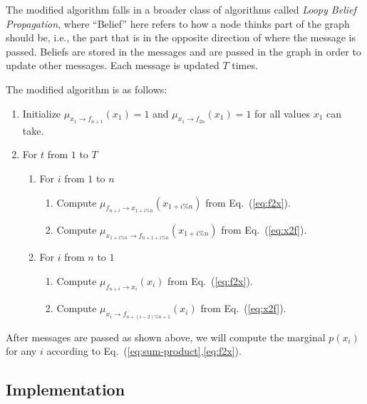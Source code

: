 \documentclass[11pt]{article}
\begin{document}
The modified algorithm falls in a broader class of algorithms called \textit{Loopy Belief Propagation}, where ``Belief'' here refers to how a node thinks part of the graph should be, i.e., the part that is in the opposite direction of where the message
is passed. Beliefs are stored in the messages and are passed in the graph in order to update other messages. Each message is updated $T$ times.

The modified algorithm is as follows:
\begin{enumerate}
\item Initialize $\mu_{x_1\rightarrow f_{n+1}}(x_1)=1$ and $\mu_{x_1\rightarrow f_{2n}}(x_1)=1$ for all values $x_1$ can take.
\item For $t$ from $1$ to $T$
    \begin{enumerate}
    \item For $i$ from $1$ to $n$
        \begin{enumerate}
        \item Compute $\mu_{f_{n+i}\rightarrow x_{1+i\%n}}(x_{1+i\%n})$ from Eq.~(\ref{eq:f2x}).
        \item Compute $\mu_{x_{1+i\%n}\rightarrow f_{n+1+i\%n}}(x_{1+i\%n})$ from Eq.~(\ref{eq:x2f}).
        \end{enumerate}
    \item For $i$ from $n$ to $1$
        \begin{enumerate}
        \item Compute $\mu_{f_{n+i}\rightarrow x_{i}}(x_{i})$ from Eq.~(\ref{eq:f2x}).
        \item Compute $\mu_{x_{i}\rightarrow f_{n+(i-2)\%n+1}}(x_i)$ from Eq.~(\ref{eq:x2f}).
        \end{enumerate}
    \end{enumerate}
\end{enumerate}

After messages are passed as shown above, we will compute the marginal $p(x_i)$ for any $i$ according to Eq.~(\ref{eq:sum-product},\ref{eq:f2x}).


\subsection{Implementation} %
\end{document}
